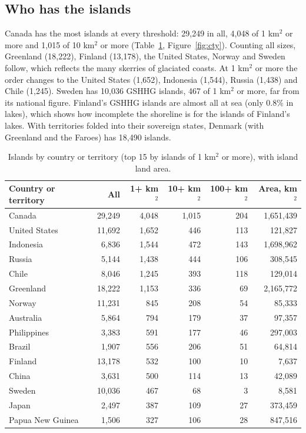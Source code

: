 \documentclass[11pt,a4paper]{article}
\begin{document}
\subsection{Who has the islands}
Canada has the most islands at every threshold: 29,249 in all, 4,048 of 1 km$^2$ or more and 1,015 of 10 km$^2$ or more (Table~\ref{tab:cty}, Figure~\ref{fig:cty}). Counting all sizes, Greenland (18,222), Finland (13,178), the United States, Norway and Sweden follow, which reflects the many skerries of glaciated coasts. At 1 km$^2$ or more the order changes to the United States (1,652), Indonesia (1,544), Russia (1,438) and Chile (1,245). Sweden has 10,036 GSHHG islands, 467 of 1 km$^2$ or more, far from its national figure. Finland's GSHHG islands are almost all at sea (only 0.8\% in lakes), which shows how incomplete the shoreline is for the islands of Finland's lakes. With territories folded into their sovereign states, Denmark (with Greenland and the Faroes) has 18,490 islands.

\begin{table}[tbp]\centering\small\caption{Islands by country or territory (top 15 by islands of 1 km$^2$ or more), with island land area.}\label{tab:cty}\begin{tabular}{lrrrrr}\toprule Country or territory & All & 1+ km$^2$ & 10+ km$^2$ & 100+ km$^2$ & Area, km$^2$\\\midrule
Canada & 29,249 & 4,048 & 1,015 & 204 & 1,651,439\\
United States & 11,692 & 1,652 & 446 & 113 & 121,827\\
Indonesia & 6,836 & 1,544 & 472 & 143 & 1,698,962\\
Russia & 5,144 & 1,438 & 444 & 106 & 308,545\\
Chile & 8,046 & 1,245 & 393 & 118 & 129,014\\
Greenland & 18,222 & 1,153 & 336 & 69 & 2,165,772\\
Norway & 11,231 & 845 & 208 & 54 & 85,333\\
Australia & 5,864 & 794 & 179 & 37 & 97,357\\
Philippines & 3,383 & 591 & 177 & 46 & 297,003\\
Brazil & 1,907 & 556 & 206 & 51 & 64,814\\
Finland & 13,178 & 532 & 100 & 10 & 7,637\\
China & 3,631 & 500 & 114 & 13 & 42,089\\
Sweden & 10,036 & 467 & 68 & 3 & 8,581\\
Japan & 2,497 & 387 & 109 & 27 & 373,459\\
Papua New Guinea & 1,506 & 327 & 106 & 28 & 847,516\\
\bottomrule\end{tabular}\end{table}
\end{document}
